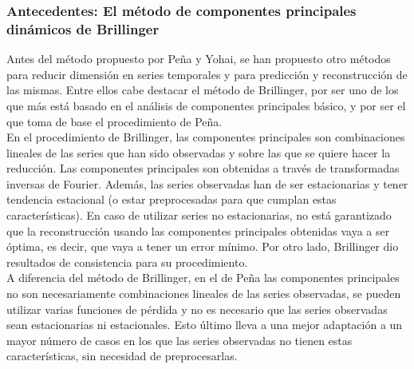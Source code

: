 \subsubsection{Antecedentes: El método de componentes principales dinámicos de Brillinger}

Antes del método propuesto por Peña y Yohai, se han propuesto otro métodos para reducir dimensión en series temporales y para predicción y reconstrucción de las mismas. Entre ellos cabe destacar el método de Brillinger, por ser uno de los que más está basado en el análisis de componentes principales básico, y por ser el que toma de base el procedimiento de Peña.\\

En el procedimiento de Brillinger, las componentes principales son combinaciones lineales de las series que han sido observadas y sobre las que se quiere hacer la reducción. Las componentes principales son obtenidas a través de transformadas inversas de Fourier. Además, las series observadas han de ser estacionarias y tener tendencia estacional (o estar preprocesadas para que cumplan estas características). En caso de utilizar series no estacionarias, no está garantizado que la reconstrucción usando las componentes principales obtenidas vaya a ser óptima, es decir, que vaya a tener un error mínimo. Por otro lado, Brillinger dio resultados de consistencia para su procedimiento.\\

A diferencia del método de Brillinger, en el de Peña las componentes principales no son necesariamente combinaciones lineales de las series observadas, se pueden utilizar varias funciones de pérdida y no es necesario que las series observadas sean estacionarias ni estacionales. Esto último lleva a una mejor adaptación a un mayor número de casos en los que las series observadas no tienen estas características, sin necesidad de preprocesarlas.\\

